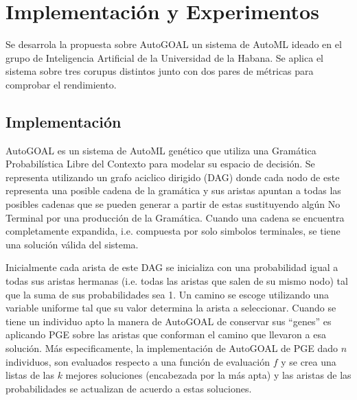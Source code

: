 \chapter{Implementación y Experimentos}\label{chapter:implementation}



Se desarrola la propuesta sobre AutoGOAL un sistema de AutoML ideado en el grupo de Inteligencia Artificial de la Universidad de la Habana.
Se aplica el sistema sobre tres corupus distintos junto con dos pares de m\'etricas para comprobar el rendimiento.

\section{Implementaci\'on}


AutoGOAL es un sistema de AutoML gen\'etico que utiliza una Gram\'atica Probabil\'istica Libre del Contexto  para modelar su espacio de decisi\'on. Se representa utilizando un grafo aciclico dirigido (DAG) donde cada nodo de este representa una posible cadena de la gram\'atica y sus aristas apuntan a todas las posibles cadenas que se pueden generar a partir de estas sustituyendo alg\'un No Terminal por una producci\'on de la Gram\'atica. Cuando una cadena se encuentra completamente expandida, i.e. compuesta por solo simbolos terminales, se tiene una soluci\'on v\'alida del sistema. 

Inicialmente cada arista de este DAG se inicializa con una probabilidad igual a todas sus aristas hermanas (i.e. todas las aristas que salen de su mismo nodo) tal que la suma de sus probabilidades sea 1. Un camino se escoge utilizando una variable uniforme tal que su valor determina la arista a seleccionar. Cuando se tiene un individuo apto la manera de AutoGOAL de conservar sus ``genes'' es aplicando PGE sobre las aristas que conforman el camino que llevaron a esa soluci\'on. M\'as especificamente, la implementaci\'on de AutoGOAL de PGE dado $n$ individuos, son evaluados respecto a una funci\'on de evaluaci\'on $f$ y se crea una listas de las $k$ mejores soluciones (encabezada por la m\'as apta) y las aristas de las probabilidades se actualizan de acuerdo a estas soluciones. 

